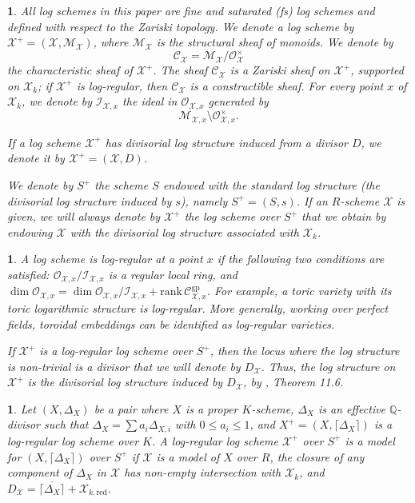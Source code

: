 \documentclass{amsart}%
\numberwithin{equation}{subsection}
\theoremstyle{plain2}
\theoremstyle{definition2}
\theoremstyle{stepstyle}
\theoremstyle{point}
\theoremstyle{subpoint}
\newtheorem{subpoint}[equation]{}%
\newcommand{\spa}[1]{\begin{subpoint}#1\end{subpoint}}           %
\newcommand{\Q}{\ensuremath{\mathbb{Q}}}
\newcommand{\cX}{\ensuremath{\mathscr{X}}}
\newcommand{\caM}{\ensuremath{\mathcal{M}}}
\newcommand{\caC}{\ensuremath{\mathcal{C}}}
\newcommand{\redu}{\mathrm{red}}
\newcommand{\gp}{\mathrm{gp}}
\begin{document}
\spa{ \label{sss-log} All log schemes in this paper are  fine and saturated (\emph{fs}) log schemes and defined with respect to the Zariski topology. We denote a log scheme by $\cX^+=(\cX,\caM_{\cX})$, where $\caM_{\cX}$ is the structural sheaf of monoids. We denote by $$\mathcal{C}_{\cX}=\mathcal{M}_{\cX}/\mathcal{O}_{\cX}^{\times}$$the characteristic sheaf of $\cX^+$. The sheaf $\mathcal{C}_{\cX}$ is a Zariski sheaf on $\cX^+$, supported on $\cX_k$; if $\cX^+$ is log-regular, then $\caC_{\cX}$ is a constructible sheaf. For every point $x$ of $\cX_k$, we denote by $\mathcal{I}_{\cX,x}$ the ideal in $\mathcal{O}_{\cX,x}$ generated by $$\mathcal{M}_{\cX,x}\setminus \mathcal{O}_{\cX,x}^{\times}.$$

If a log scheme $\cX^+$ has divisorial log structure induced from a divisor $D$, we denote it by $\cX^+=(\cX,D)$. 

We denote by $S^+$ the scheme $S$ endowed with the standard log structure (the divisorial log structure induced by $s$), namely $S^+=(S,s)$. If an $R$-scheme $\cX$ is given, we will always denote by $\cX^+$ the log scheme over $S^+$ that we obtain by endowing $\cX$ with the divisorial log structure associated with
$\cX_k$.}

\spa{A log scheme is log-regular at a point $x$ if the following two conditions are satisfied: $\mathcal{O}_{\cX,x}/\mathcal{I}_{\cX,x}$ is a regular local ring, and $\dim \mathcal{O}_{\cX,x} = \dim \mathcal{O}_{\cX,x}/\mathcal{I}_{\cX,x}+\mathrm{rank}\,\mathcal{C}^{\gp}_{\cX,x}$. For example, a toric variety with its toric logarithmic structure is log-regular. More generally, working over perfect fields, toroidal embeddings can be identified as log-regular varieties.

If $\cX^+$ is a log-regular log scheme over $S^+$, then the locus where the log structure is non-trivial is a divisor that we will denote by $D_{\cX}$. Thus, the log structure on $\cX^+$ is the divisorial log structure induced by $D_{\cX}$, by \cite{Kato1994a}, Theorem 11.6.
}

\spa{Let $(X,\Delta_X)$ be a pair where $X$ is a proper $K$-scheme, $\Delta_X$ is an effective $\Q$-divisor such that $\Delta_X= \sum a_i \Delta_{X,i}$ with $0 \leqslant a_i \leqslant 1$, and $X^+=(X,\lceil \Delta_X \rceil)$ is a log-regular log scheme over $K$. A log-regular log scheme $\cX^+$ over $S^+$ is a model for $(X,\lceil \Delta_X \rceil)$ over $S^+$ if $\cX$ is a model of $X$ over $R$, the closure of any component of $\Delta_X$ in $\cX$ has non-empty intersection with $\cX_k$, and $D_\cX = \overline{\lceil \Delta_X \rceil} + \cX_{k,\redu}$. }
\end{document}
